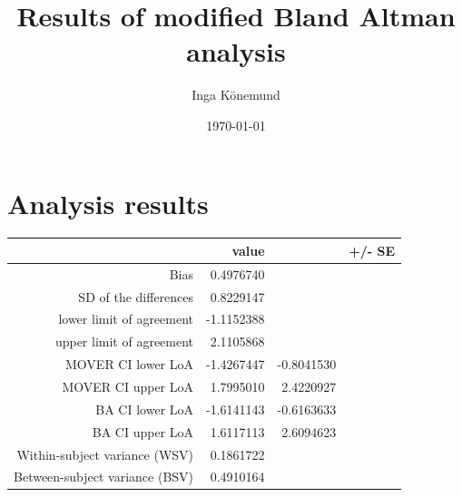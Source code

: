 \documentclass{article}\usepackage[]{graphicx}\usepackage[]{color}
\title{Results of modified Bland Altman analysis}
\author{Inga Könemund}
\date{\today}
\begin{document}
\maketitle

\newpage
\section{Analysis results}





\begin{table}[ht]
\centering
\begin{tabular}{rrrr}
  \hline
 & value &   & +/- SE \\ 
  \hline
Bias & 0.4976740 &  &  \\ 
  SD of the differences & 0.8229147 &  &  \\ 
  lower limit of agreement & -1.1152388 &  &  \\ 
  upper limit of agreement & 2.1105868 &  &  \\ 
  MOVER CI lower LoA & -1.4267447 & -0.8041530 &  \\ 
  MOVER CI upper LoA & 1.7995010 & 2.4220927 &  \\ 
  BA CI lower LoA & -1.6141143 & -0.6163633 &  \\ 
  BA CI upper LoA & 1.6117113 & 2.6094623 &  \\ 
  Within-subject variance (WSV) & 0.1861722 &  &  \\ 
  Between-subject variance (BSV) & 0.4910164 &  &  \\ 
   \hline
\end{tabular}
\end{table}


\end{document}

